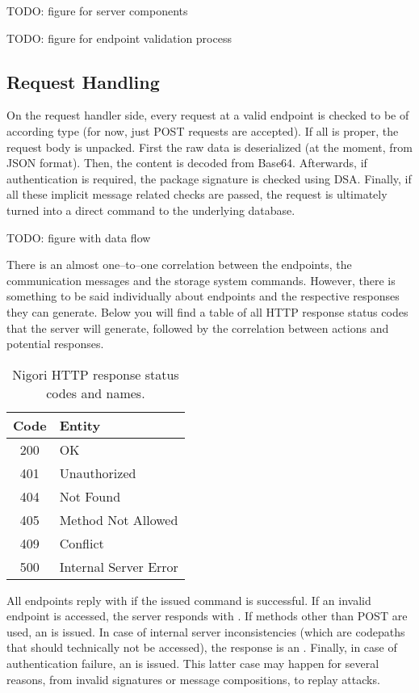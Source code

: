 TODO: figure for server components

TODO: figure for endpoint validation process

\subsection{Request Handling}
On the request handler side, every request at a valid endpoint is checked to be of according type (for now, just POST requests are accepted).
If all is proper, the request body is unpacked.
First the raw data is deserialized (at the moment, from JSON format).
Then, the content is decoded from Base64.
Afterwards, if authentication is required, the package signature is checked using DSA.
Finally, if all these implicit message related checks are passed, the request is ultimately turned into a direct command to the underlying database.

TODO: figure with data flow

There is an almost one--to--one correlation between the endpoints, the communication messages and the storage system commands.
However, there is something to be said individually about endpoints and the respective responses they can generate.
Below you will find a table of all HTTP response status codes that the server will generate, followed by the correlation between actions and potential responses.

\begin{table}[H]
  \centering
  \begin{tabular}{ | c | l | }
    \hline
    \textbf{Code} & \textbf{Entity} \\ \hline
  \hline
    200 & OK \\ \hline
    401 & Unauthorized \\ \hline
    404 & Not Found \\ \hline
    405 & Method Not Allowed \\ \hline
    409 & Conflict \\ \hline
    500 & Internal Server Error \\ \hline
  \end{tabular}
  \caption{Nigori HTTP response status codes and names.}
\end{table}

All endpoints reply with  if the issued command is successful.
If an invalid endpoint is accessed, the server responds with .
If methods other than POST are used, an  is issued.
In case of internal server inconsistencies (which are codepaths that should technically not be accessed), the response is an .
Finally, in case of authentication failure, an  is issued.
This latter case may happen for several reasons, from invalid signatures or message compositions, to replay attacks.

